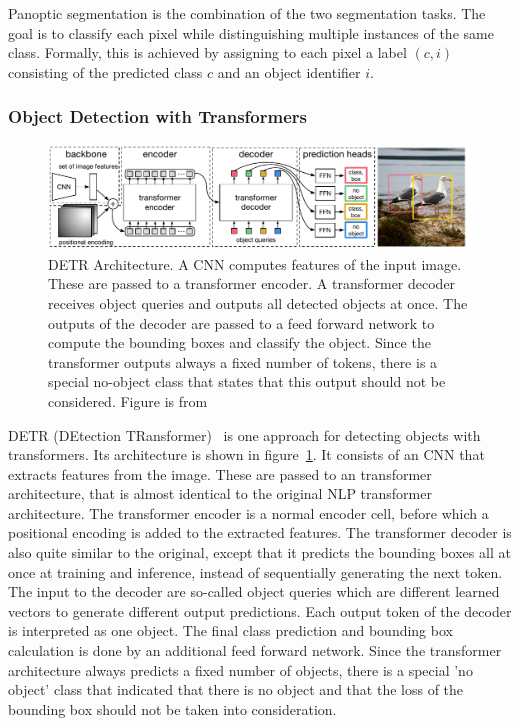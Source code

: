 \documentclass[a4paper]{scrartcl}
\begin{document}
    Panoptic segmentation is the combination of the two segmentation tasks.
    The goal is to classify each pixel while distinguishing multiple instances of the same class.
    Formally, this is achieved by assigning to each pixel a label $(c, i)$ consisting of the predicted class $c$ and an object identifier $i$.

    \subsubsection{Object Detection with Transformers}
    \begin{figure}[btp]
        \centering
        \includegraphics[width=1.0\linewidth]{img/DetrArchitecture}
        \caption[DETR Architecture]{DETR Architecture.
        A CNN computes features of the input image.
        These are passed to a transformer encoder.
        A transformer decoder receives object queries and outputs all detected objects at once.
        The outputs of the decoder are passed to a feed forward network to compute the bounding boxes and classify the object.
        Since the transformer outputs always a fixed number of tokens, there is a special no-object class that states that this output should not be considered.
        Figure is from~\cite{carion2020endtoend}}
        \label{fig:detr-architecture}
    \end{figure}

    DETR (DEtection TRansformer)~\cite{carion2020endtoend} is one approach for detecting objects with transformers.
    Its architecture is shown in figure~\ref{fig:detr-architecture}.
    It consists of an CNN that extracts features from the image.
    These are passed to an transformer architecture, that is almost identical to the original NLP transformer architecture.
    The transformer encoder is a normal encoder cell, before which a positional encoding is added to the extracted features.
    The transformer decoder is also quite similar to the original, except that it predicts the bounding boxes all at once at training and inference, instead of sequentially generating the next token.
    The input to the decoder are so-called object queries which are different learned vectors to generate different output predictions.
    Each output token of the decoder is interpreted as one object.
    The final class prediction and bounding box calculation is done by an additional feed forward network.
    Since the transformer architecture always predicts a fixed number of objects, there is a special 'no object' class that indicated that there is no object and that the loss of the bounding box should not be taken into consideration.
\end{document}
